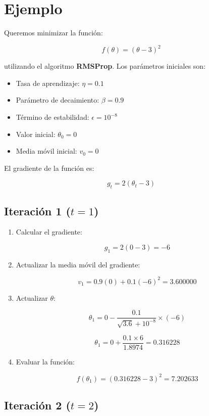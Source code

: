 \documentclass[a5paper]{article}
\begin{document}
	\section*{Ejemplo}
	Queremos minimizar la función:
	
	\[
	f(\theta) = (\theta - 3)^2
	\]
	
	utilizando el algoritmo \textbf{RMSProp}. Los parámetros iniciales son:
	
	\begin{itemize}
		\item Tasa de aprendizaje: \( \eta = 0.1 \)
		\item Parámetro de decaimiento: \( \beta = 0.9 \)
		\item Término de estabilidad: \( \epsilon = 10^{-8} \)
		\item Valor inicial: \( \theta_0 = 0 \)
		\item Media móvil inicial: \( v_0 = 0 \)
	\end{itemize}
	
	El gradiente de la función es:
	
	\[
	g_t = 2(\theta_t - 3)
	\]
	
	
	\subsection*{Iteración 1 (\( t = 1 \))}
	
	\begin{enumerate}
		\item Calcular el gradiente:
		
		\[
		g_1 = 2(0 - 3) = -6
		\]
		
		\item Actualizar la media móvil del gradiente:
		
		\[
		v_1 = 0.9(0) + 0.1(-6)^2 = 3.600000
		\]
		
		\item Actualizar \( \theta \):
		
		\[
		\theta_1 = 0 - \frac{0.1}{\sqrt{3.6} + 10^{-8}} \times (-6)
		\]
		
		\[
		\theta_1 = 0 + \frac{0.1 \times 6}{1.8974} = 0.316228
		\]
		
		\item Evaluar la función:
		
		\[
		f(\theta_1) = (0.316228 - 3)^2 = 7.202633
		\]
	\end{enumerate}
	
	\subsection*{Iteración 2 (\( t = 2 \))}
	
\end{document}
